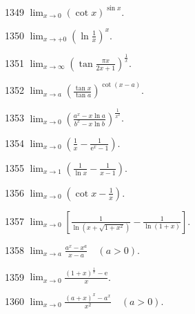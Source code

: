 \begin{prob}[S]{1349}
$\lim_{x \to 0} (\cot x)^{\sin x}$.
\end{prob}

\begin{prob}[S]{1350}
$\lim_{x \to +0} \left( \ln\frac{1}{x} \right)^x$.
\end{prob}

\begin{prob}[S]{1351}
$\lim_{x \to \infty} \left( \tan\frac{\pi x}{2x + 1} \right)^{\frac{1}{x}}$.
\end{prob}

\begin{prob}[S]{1352}
$\lim_{x \to a} \left( \frac{\tan x}{\tan a} \right)^{\cot(x - a)}$.
\end{prob}

\begin{prob}[S]{1353}
$\lim_{x \to 0} \left( \frac{a^x - x\ln a}{b^x - x\ln b} \right)^{\frac{1}{x^2}}$.
\end{prob}

\begin{prob}[S]{1354}
$\lim_{x \to 0} \left( \frac{1}{x} - \frac{1}{\mathrm{e}^x - 1} \right)$.
\end{prob}

\begin{prob}[S]{1355}
$\lim_{x \to 1} \left( \frac{1}{\ln x} - \frac{1}{x - 1} \right)$.
\end{prob}

\begin{prob}[S]{1356}
$\lim_{x \to 0} \left( \cot x - \frac{1}{x} \right)$.
\end{prob}

\begin{prob}[S]{1357}
$\lim_{x \to 0} \left[ \frac{1}{\ln(x + \sqrt{1 + x^2})} - \frac{1}{\ln(1 + x)} \right]$.
\end{prob}

\begin{prob}[S]{1358}
$\lim_{x \to a} \frac{a^x - x^a}{x - a} \quad (a > 0)$.
\end{prob}

\begin{prob}[S]{1359}
$\lim_{x \to 0} \frac{(1 + x)^{\frac{1}{x}} - \mathrm{e}}{x}$.
\end{prob}

\begin{prob}[S]{1360}
$\lim_{x \to 0} \frac{(a + x)^x - a^x}{x^2} \quad (a > 0)$.
\end{prob}

